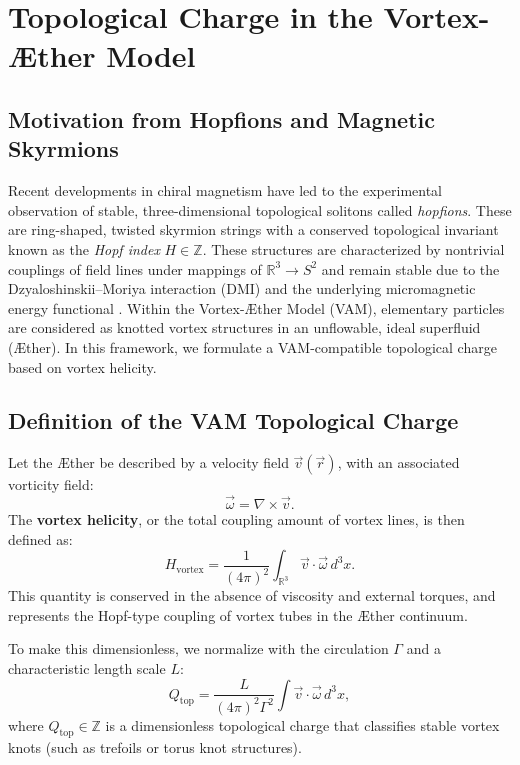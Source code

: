 \section{Topological Charge in the Vortex-Æther Model}\label{appendix:9}

\subsection{Motivation from Hopfions and Magnetic Skyrmions}

Recent developments in chiral magnetism have led to the experimental observation of stable, three-dimensional topological solitons called \emph{hopfions}. These are ring-shaped, twisted skyrmion strings with a conserved topological invariant known as the \emph{Hopf index} $H \in \mathbb{Z}$. These structures are characterized by nontrivial couplings of field lines under mappings of $\mathbb{R}^3 \to S^2$ and remain stable due to the Dzyaloshinskii–Moriya interaction (DMI) and the underlying micromagnetic energy functional \cite{Zheng2023Hopfions}. Within the Vortex-Æther Model (VAM), elementary particles are considered as knotted vortex structures in an unflowable, ideal superfluid (Æther). In this framework, we formulate a VAM-compatible topological charge based on vortex helicity.

\subsection{Definition of the VAM Topological Charge}

Let the Æther be described by a velocity field $\vec{v}(\vec{r})$, with an associated vorticity field:
\begin{equation}
    \vec{\omega} = \nabla \times \vec{v}.
\end{equation}
The \textbf{vortex helicity}, or the total coupling amount of vortex lines, is then defined as:
\begin{equation}
    H_{\text{vortex}} = \frac{1}{(4\pi)^2} \int_{\mathbb{R}^3} \vec{v} \cdot \vec{\omega} \, d^3x.
    \label{eq:helicity}
\end{equation}
This quantity is conserved in the absence of viscosity and external torques, and represents the Hopf-type coupling of vortex tubes in the Æther continuum.

To make this dimensionless, we normalize with the circulation $\Gamma$ and a characteristic length scale $L$:
\begin{equation}
    Q_{\text{top}} = \frac{L}{(4\pi)^2 \Gamma^2} \int \vec{v} \cdot \vec{\omega} \, d^3x,
    \label{eq:qtop}
\end{equation}
where $Q_{\text{top}} \in \mathbb{Z}$ is a dimensionless topological charge that classifies stable vortex knots (such as trefoils or torus knot structures).

